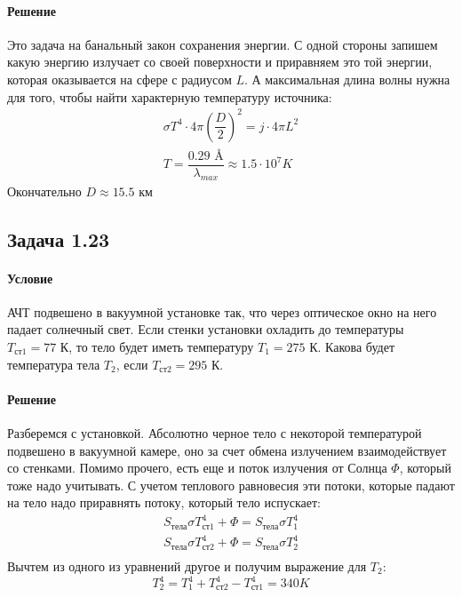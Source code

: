 \documentclass[12pt]{article}
\begin{document}
\paragraph{Решение}
Это задача на банальный закон сохранения энергии. С одной стороны запишем какую энергию излучает со своей поверхности и приравняем это той энергии, которая оказывается на сфере с радиусом $L$. А максимальная длина волны нужна для того, чтобы найти характерную температуру источника:
\begin{gather*}
    \sigma T^4 \cdot 4\pi\left( \dfrac{D}{2}\right)^2 = j\cdot4\pi L^2 \\
    T = \dfrac{0.29 \text{ \AA}}{\lambda_{max}} \approx 1.5 \cdot 10^7 K
\end{gather*}
Окончательно $D\approx15.5$ км
\subsection{Задача 1.23}
\label{task_123}
\paragraph{Условие}
АЧТ подвешено в вакуумной установке так, что через оптическое окно на него падает солнечный свет. Если стенки установки охладить до температуры $T_{\text{ст1}} = 77 $ К, то тело будет иметь температуру $T_{1} = 275 $ К. Какова будет температура тела $T_2$, если $T_{\text{ст2}} = 295 $ К.
\paragraph{Решение}
Разберемся с установкой. Абсолютно черное тело с некоторой температурой подвешено в вакуумной камере, оно за счет обмена излучением взаимодействует со стенками. Помимо прочего, есть еще и поток излучения от Солнца $\Phi$, который тоже надо учитывать. С учетом теплового равновесия эти потоки, которые падают на тело надо приравнять потоку, который тело испускает:
\begin{gather*}
    S_{\text{тела}}\sigma T^4_{\text{ст1}} + \Phi = S_{\text{тела}}\sigma T^4_1\\
    S_{\text{тела}}\sigma T^4_{\text{ст2}} + \Phi = S_{\text{тела}}\sigma T^4_2\\
\end{gather*}
Вычтем из одного из уравнений другое и получим выражение для $T_2$:
\begin{equation*}
    T_2^4 = T_1^4 + T^4_{\text{ст2}} - T^4_{\text{ст1}} = 340 K
\end{equation*}
\end{document}
